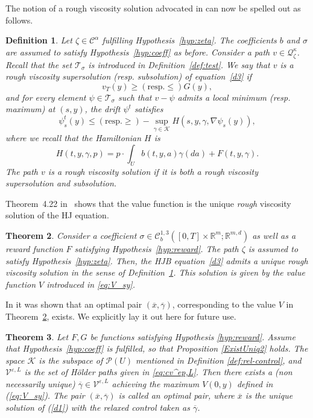 \documentclass[12pt,reqno]{amsart}
\numberwithin{equation}{section}  %
\newcommand{\1}{{\bf 1}}
\newcommand{\2}{{\bf 2}}
\newtheorem{theorem}{Theorem}[section]
\newtheorem{definition}[theorem]{Definition}
\theoremstyle{remark}
\theoremstyle{remark}
\begin{document}
The notion of a rough viscosity solution advocated in \cite{CHT} can now be spelled out as follows.
\begin{definition}\label{def:rough-visc}
	Let $\zeta \in \mathcal C^\alpha$ fulfilling Hypothesis~\ref{hyp:zeta}. The coefficients $b$ and $\sigma$ are assumed to satisfy Hypothesis~\ref{hyp:coeff} as before. Consider a path $v \in \mathcal Q_\zeta^\kappa$. Recall that the set $\mathcal T_\sigma$ is introduced in Definition~\ref{def:test}. We say that $v$ is a rough viscosity supersolution (resp. subsolution) of equation~\eqref{d3} if
	\[
		v_T(y) \geq (\text{resp.} \leq) G(y),
	\]
	and for every element $\psi \in \mathcal T_\sigma$ such that $v-\psi$ admits a local minimum (resp. maximum) at $(s,y)$, the drift $\psi^t$ satisfies
	\[
		\psi^t_s(y) \leq (\text{resp.} \geq) - \sup_{\gamma \in \mathcal K} H(s,y,\gamma,\nabla\psi_s(y)),
	\]
	where we recall that the Hamiltonian $H$ is 
	\begin{equation} \label{eq:Hamil}
		H(t,y,\gamma,p) = p \cdot \int_U b(t,y,a) \gamma(da) + F(t,y,\gamma).
	\end{equation}
The path	$v$ is a rough viscosity solution if it is both a rough viscosity supersolution and subsolution.
\end{definition}
Theorem~4.22 in~\cite{CHT} shows that the value function is the unique {\it rough} viscosity solution of the HJ equation. 
\begin{theorem}\label{thm:HJBequation}
	Consider a coefficient $\sigma \in \mathcal C_b^{1,3}([0,T]\times \mathbb R^m;\mathbb R^{m,d})$ as well as a reward function $F$ satisfying Hypothesis~\ref{hyp:reward}. The path $\zeta$ is assumed to satisfy Hypothesis~\ref{hyp:zeta}. Then, the HJB equation~\eqref{d3} admits a unique rough viscosity solution in the sense of Definition~\ref{def:rough-visc}. This solution is given by the value function $V$ introduced in \eqref{eq:V_sy}.
\end{theorem}

In \cite[Proposition 4.4]{CHT} it was shown that an optimal pair $(\overline{x},\overline{\gamma})$, corresponding to the value $V$ in Theorem~\ref{thm:HJBequation}, exists. We explicitly lay it out here for future use.

\begin{theorem}\label{thm:Optimal Pair} Let $F,G$ be functions satisfying Hypothesis \ref{hyp:reward}. Assume that Hypothesis~\ref{hyp:coeff} is fulfilled, so that Proposition \ref{ExistUniq2} holds. The space $\mathcal{K}$ is the subspace of $\mathcal{P}(U)$ mentioned in Definition \ref{def:rel-control}, and $\mathcal{V}^{\varepsilon,L}$ is the set of H\"older paths given in \eqref{eq:cv^ep,L}.  Then there exists a (non necessarily unique) $\overline{\gamma}\in \mathcal{V}^{\varepsilon,L}$ achieving the maximum $V(0,y)$ defined in (\ref{eq:V_sy}). The pair $(\overline{x},\overline{\gamma})$ is called an optimal pair, where $\overline{x}$ is the unique solution of (\ref{d1}) with the relaxed control taken as $\overline{\gamma}$. 
    
\end{theorem}
\end{document}
